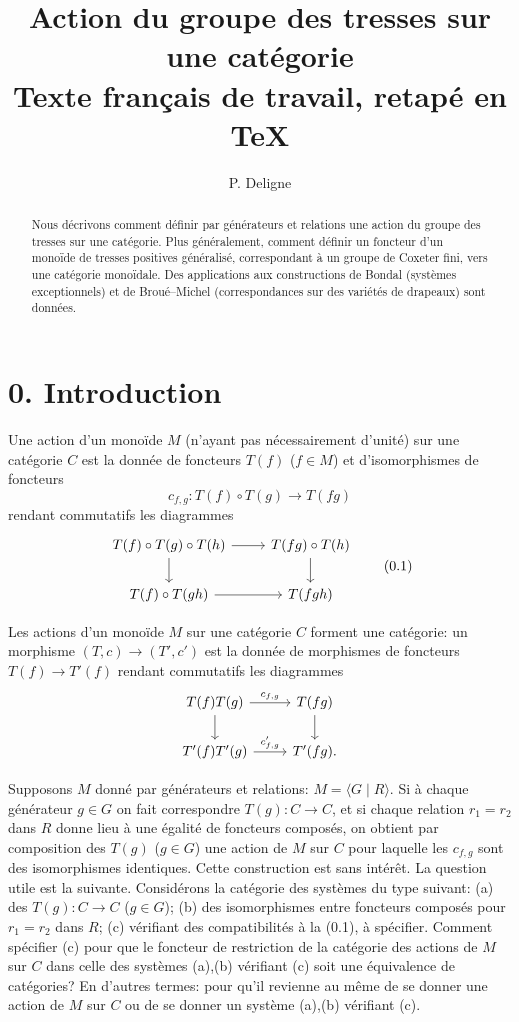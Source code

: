\documentclass[11pt]{article}
\title{Action du groupe des tresses sur une catégorie\\\large Texte français de travail, retapé en \TeX}
\author{P. Deligne}
\date{}
\begin{document}
\maketitle

\begin{abstract}
Nous décrivons comment définir par générateurs et relations une action du groupe des tresses sur une catégorie. Plus généralement, comment définir un foncteur d'un monoïde de tresses positives généralisé, correspondant à un groupe de Coxeter fini, vers une catégorie monoïdale. Des applications aux constructions de Bondal (systèmes exceptionnels) et de Broué--Michel (correspondances sur des variétés de drapeaux) sont données.
\end{abstract}

\tableofcontents

\section*{0. Introduction}
Une action d'un monoïde $M$ (n'ayant pas nécessairement d'unité) sur une catégorie $C$ est la donnée de foncteurs $T(f)$ ($f\in M$) et d'isomorphismes de foncteurs
\[
 c_{f,g}:T(f)\circ T(g)\longrightarrow T(fg)
\]
rendant commutatifs les diagrammes
\begin{equation}
\begin{tikzcd}
T(f)\circ T(g)\circ T(h) \arrow[r] \arrow[d] & T(fg)\circ T(h) \arrow[d]\\
T(f)\circ T(gh) \arrow[r] & T(fgh)
\end{tikzcd}\tag{0.1}
\end{equation}

Les actions d'un monoïde $M$ sur une catégorie $C$ forment une catégorie: un morphisme $(T,c)\to(T',c')$ est la donnée de morphismes de foncteurs $T(f)\to T'(f)$ rendant commutatifs les diagrammes
\[
\begin{tikzcd}
T(f)T(g) \arrow[r,"c_{f,g}"] \arrow[d] & T(fg) \arrow[d]\\
T'(f)T'(g) \arrow[r,"c'_{f,g}"] & T'(fg).
\end{tikzcd}
\]

Supposons $M$ donné par générateurs et relations: $M=\langle G\mid R\rangle$. Si à chaque générateur $g\in G$ on fait correspondre $T(g):C\to C$, et si chaque relation $r_1=r_2$ dans $R$ donne lieu à une égalité de foncteurs composés, on obtient par composition des $T(g)$ ($g\in G$) une action de $M$ sur $C$ pour laquelle les $c_{f,g}$ sont des isomorphismes identiques. Cette construction est sans intérêt. La question utile est la suivante. Considérons la catégorie des systèmes du type suivant: (a) des $T(g):C\to C$ ($g\in G$); (b) des isomorphismes entre foncteurs composés pour $r_1=r_2$ dans $R$; (c) vérifiant des compatibilités à la (0.1), à spécifier. Comment spécifier (c) pour que le foncteur de restriction de la catégorie des actions de $M$ sur $C$ dans celle des systèmes (a),(b) vérifiant (c) soit une équivalence de catégories? En d'autres termes: pour qu'il revienne au même de se donner une action de $M$ sur $C$ ou de se donner un système (a),(b) vérifiant (c).
\end{document}

